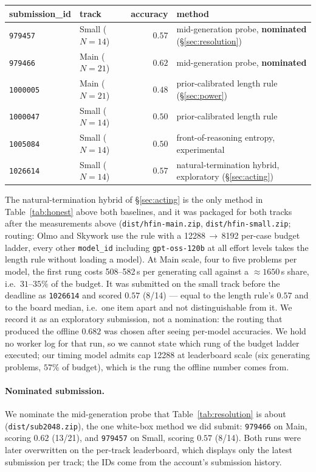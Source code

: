 \documentclass[10pt]{article}
\begin{document}
\begin{center}\small
\begin{tabular}{llrl}
\toprule
submission\_id & track & accuracy & method \\
\midrule
\texttt{979457} & Small ($N{=}14$) & $\mathbf{0.57}$ & mid-generation probe, \textbf{nominated} (\S\ref{sec:resolution}) \\
\texttt{979466} & Main ($N{=}21$)  & $\mathbf{0.62}$ & mid-generation probe, \textbf{nominated} \\
\texttt{1000005} & Main ($N{=}21$)  & $0.48$ & prior-calibrated length rule (\S\ref{sec:power}) \\
\texttt{1000047} & Small ($N{=}14$) & $0.50$ & prior-calibrated length rule \\
\texttt{1005084} & Small ($N{=}14$) & $0.50$ & front-of-reasoning entropy, experimental \\
\texttt{1026614} & Small ($N{=}14$) & $0.57$ & natural-termination hybrid, exploratory (\S\ref{sec:acting}) \\
\bottomrule
\end{tabular}
\end{center}

The natural-termination hybrid of \S\ref{sec:acting} is the only method in
Table~\ref{tab:honest} above both baselines, and it was packaged for both tracks after the
measurements above (\texttt{dist/hfin-main.zip}, \texttt{dist/hfin-small.zip}; routing: Olmo and
Skywork use the rule with a 12288\,$\to$\,8192 per-case budget ladder, every other
\texttt{model\_id} including \texttt{gpt-oss-120b} at all effort levels takes the length rule
without loading a model). At Main scale, four to five problems per model, the first rung costs
508--582\,s per generating call against a $\approx 1650$\,s share, i.e.\ $31$--$35\%$ of the budget.
It was submitted on the small track before the deadline as \texttt{1026614} and scored $\mathbf{0.57}$ (8/14)
--- equal to the length rule's $0.57$ and to the board median, i.e.\ one item apart and not
distinguishable from it. We record it as an exploratory submission, not a nomination: the
routing that produced the offline $0.682$ was chosen after seeing per-model accuracies. We hold
no worker log for that run, so we cannot state which rung of the budget ladder executed; our
timing model admits cap 12288 at leaderboard scale (six generating problems, $57\%$ of budget),
which is the rung the offline number comes from.

\paragraph{Nominated submission.} We nominate the mid-generation probe that
Table~\ref{tab:resolution} is about (\texttt{dist/sub2048.zip}), the one white-box method we did
submit: \texttt{979466} on Main, scoring $0.62$ (13/21), and \texttt{979457} on Small, scoring
$0.57$ (8/14). Both runs were later overwritten on the per-track leaderboard, which displays only
the latest submission per track; the IDs come from the account's submission history.
\end{document}
